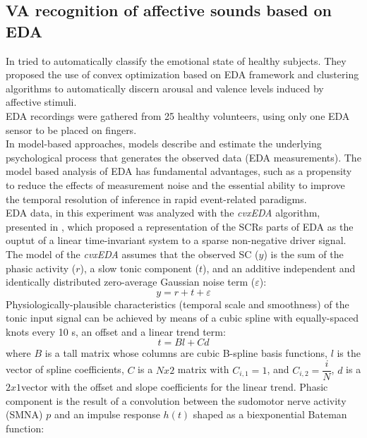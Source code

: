 \subsection{VA recognition of affective sounds based on EDA}
In \cite{greco2016arousal} tried to automatically classify the emotional state of healthy subjects. They proposed the use of convex optimization based on EDA framework and clustering algorithms to automatically discern arousal and valence levels induced by affective stimuli.
\\ \indent
EDA recordings were gathered from 25 healthy volunteers, using only one EDA sensor to be placed on fingers.
\\
In model-based approaches, models describe and estimate the underlying psychological process that generates the observed data (EDA measurements). The model based analysis of EDA has fundamental advantages, such as a propensity to reduce the effects of measurement noise and the essential ability to improve the temporal resolution of inference in rapid event-related paradigms.
\\ \indent
EDA data, in this experiment was analyzed with the \textit{cvxEDA} algorithm, presented in \cite{greco2015cvxeda}, which proposed a representation of the SCRs parts of EDA as the ouptut of a linear time-invariant system to a sparse non-negative driver signal.
\\
The model of the \textit{cvxEDA} assumes that the observed SC ($y$) is the sum of the phasic activity ($r$), a slow tonic component ($t$), and an additive independent and identically distributed zero-average Gaussian noise term ($\varepsilon$):
\begin{equation}
	y=r+t+\varepsilon
\end{equation}
Physiologically-plausible characteristics (temporal scale and smoothness) of the tonic input signal can be achieved by means of a cubic spline with equally-spaced knots every 10 s, an offset and a linear trend term:
\begin{equation}
	\label{eq:tonic_model}
	t=Bl+Cd
\end{equation}
where $B$ is a tall matrix whose columns are cubic B-spline basis functions, $l$ is the vector of spline coefficients, $C$ is a $Nx2$ matrix with $C_{i,1} = 1$, and $C_{i,2} = \dfrac{i}{N}$, $d$ is a $2x1$vector with the offset and slope coefficients for the linear trend.
Phasic component is the result of a convolution between the sudomotor nerve activity (SMNA) $p$ and an impulse response $h(t)$ shaped as a biexponential Bateman function:
